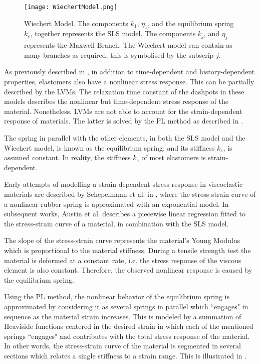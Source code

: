 \begin{figure}[hbt!]
	\centering
    \texttt{[image: WiechertModel.png]}
    \caption{Wiechert Model. The components $k_1$, $\eta_1$, and the equilibrium spring $k_e$, together represents the SLS model. The components $k_j$, and $\eta_j$ represents the Maxwell Branch. The Wiechert model can contain as many branches as required, this is symbolised by the subscrip $j$. }
    \label{fig:wiechert}
\end{figure}

As previously described in , in addition to time-dependent and history-dependent properties, elastomers also have a nonlinear stress response. This can be partially described by the LVMs. The relaxation time constant of the dashpots in these models describes the nonlinear but time-dependent stress response of the material. Nonetheless, LVMs are not able to account for the strain-dependent response of materials. The latter is solved by the PL method as described in \cite{austin2015control}.

The spring in parallel with the other elements, in both the SLS model and the Wiechert model, is known as the equilibrium spring, and its stiffness $k_e$, is assumed constant. In reality, the stiffness $k_e$ of most elastomers is strain-dependent. 

Early attempts of modelling a strain-dependent stress response in viscoelastic materials are described by Schepelmann et al. in \cite{schepelmann2014compact}, where the stress-strain curve of a nonlinear rubber spring is approximated with an exponential model. In subsequent works, Austin et al. describes a piecewise linear regression fitted to the stress-strain curve of a material, in combination with the SLS model. 

The slope of the stress-strain curve represents the material's Young Modulus which is proportional to the material stiffness. During a tensile strength test the material is deformed at a constant rate, i.e. the stress response of the viscous element is also constant. Therefore, the observed nonlinear response is caused by the equilibrium spring.

Using the PL method, the nonlinear behavior of the equilibrium spring is approximated by considering it as several springs in parallel which ``engages" in sequence as the material strain increases. This is modeled by a summation of Heaviside functions centered in the desired strain in which each of the mentioned springs ``engages" and contributes with the total stress response of the material. In other words, the stress-strain curve of the material is segmented in several sections which relates a single stiffness to a strain range. This is illustrated in .

